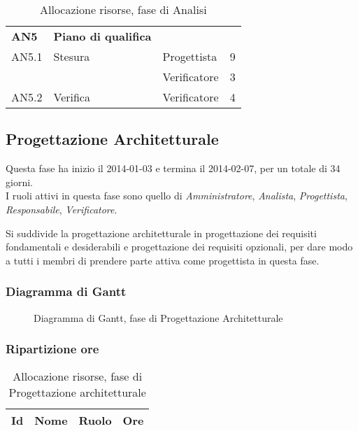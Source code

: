 \begin{table}[H]
\begin{tabular}{ l l l c  }
	\hline
	\textbf{AN5} & \textbf{Piano di qualifica} \\
	\cline{3-4}
	AN5.1 & Stesura & Progettista& 9\\ 
    & & Verificatore & 3 \\
    \cline{3-4}
	AN5.2 & Verifica & Verificatore &  4\\
	
	\hline
	\end{tabular}
	\caption{Allocazione risorse, fase di Analisi}
	\end{table}

	
	\subsection{Progettazione Architetturale}
	
Questa fase ha inizio il 2014-01-03 e termina il 2014-02-07, per un totale di 34  giorni. \\
I ruoli attivi in questa fase sono quello di \textit{Amministratore}, \textit{Analista}, \textit{Progettista}, \textit{Responsabile}, \textit{Verificatore}.

Si suddivide la progettazione architetturale in progettazione dei requisiti fondamentali e desiderabili e progettazione dei requisiti opzionali, per dare modo a tutti i membri di prendere parte attiva come progettista in questa fase.

\subsubsection{Diagramma di Gantt}

\begin{figure}[H]
\centering
\scalebox{0.95}{%

	

}
\caption{Diagramma di Gantt, fase di Progettazione Architetturale}
\end{figure}
	
\subsubsection{Ripartizione ore}
	
	\begin{table}[H]
	\begin{adjustwidth}{-4cm}{-4cm}
	\centering
	\begin{tabular}{ l l l c  }
	\hline
	\multicolumn{1}{c}{\textbf{Id}} & 
	\multicolumn{1}{c}{\textbf{Nome}} & 
	\multicolumn{1}{c}{\textbf{Ruolo}}& 
	\multicolumn{1}{c}{\textbf{Ore}} \\
	\hline
	
		
	
	\end{tabular}
	\caption{Allocazione risorse, fase di Progettazione architetturale}
	\end{adjustwidth}
	\end{table}
	
